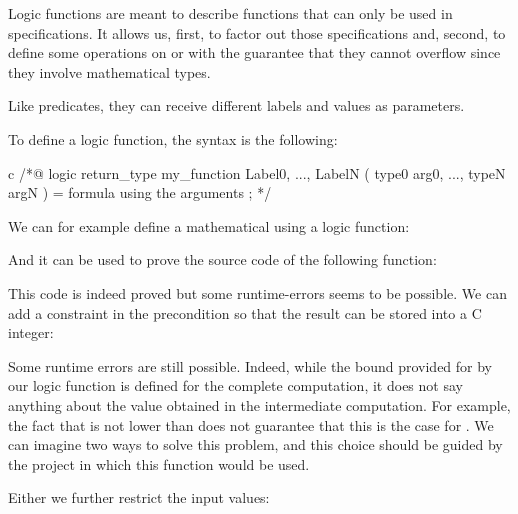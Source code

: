 Logic functions are meant to describe functions that can only be used in
specifications. It allows us, first, to factor out those specifications and,
second, to define some operations on  or 
with the guarantee that they cannot overflow since they involve mathematical
types.

Like predicates, they can receive different labels and values as
parameters.





To define a logic function, the syntax is the following:



\begin{CodeBlock}{c}
/*@
  logic return_type my_function{ Label0, ..., LabelN }( type0 arg0, ..., typeN argN ) =
    formula using the arguments ;
*/
\end{CodeBlock}



We can for example define a mathematical  using a logic function:






And it can be used to prove the source code of the following function:








This code is indeed proved but some runtime-errors seems to be possible.
We can add a constraint in the precondition so that the result can be
stored into a C integer:




Some runtime errors are still possible. Indeed, while the bound provided
for  by our logic function is defined for the complete
computation, it does not say anything about the value obtained in the
intermediate computation. For example, the fact that
 is not lower than  does not
guarantee that this is the case for . We can imagine
two ways to solve this problem, and this choice should be guided by the
project in which this function would be used.


Either we further restrict the input values:


